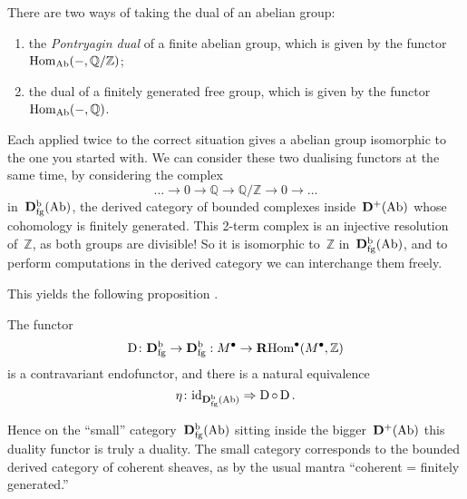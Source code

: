 \documentclass[10pt,a4paper]{article}
\begin{document}
There are two ways of taking the dual of an abelian group:
\begin{enumerate}
  \item the \emph{Pontryagin dual} of a finite abelian group, which is given by the functor~$\operatorname{Hom}_{\mathrm{Ab}}(-,\mathbb{Q}/\mathbb{Z})$;
  \item the dual of a finitely generated free group, which is given by the functor~$\operatorname{Hom}_{\mathrm{Ab}}(-,\mathbb{Q})$.
\end{enumerate}
Each applied twice to the correct situation gives a abelian group isomorphic to the one you started with. We can consider these two dualising functors at the same time, by considering the complex
\begin{equation}
  \dotso\to0\to\mathbb{Q}\to\mathbb{Q}/\mathbb{Z}\to0\to\dotso
\end{equation}
in~$\mathbf{D}_{\mathrm{fg}}^{\mathrm{b}}(\mathrm{Ab})$, the derived category of bounded complexes inside~$\mathbf{D}^+(\mathrm{Ab})$ whose cohomology is finitely generated. This 2-term complex is an injective resolution of~$\mathbb{Z}$, as both groups are divisible! So it is isomorphic to~$\mathbb{Z}$ in~$\mathbf{D}_{\mathrm{fg}}^{\mathrm{b}}(\mathrm{Ab})$, and to perform computations in the derived category we can interchange them freely.

This yields the following proposition \cite[proposition:V.1-1]{hartshorne-residues-and-duality}.
\begin{proposition}
  \label{proposition:duality-abelian-groups}
  The functor
  \begin{equation}
    \operatorname{D}\colon\mathbf{D}_{\mathrm{fg}}^{\mathrm{b}}\to\mathbf{D}_{\mathrm{fg}}^{\mathrm{b}}:M^\bullet\to\operatorname{\mathbf{R}Hom}^\bullet(M^\bullet,\mathbb{Z})
  \end{equation}
  is a contravariant endofunctor, and there is a natural equivalence
  \begin{equation}
    \eta\colon\mathrm{id}_{\mathbf{D}_{\mathrm{fg}}^{\mathrm{b}}(\mathrm{Ab})}\Rightarrow\operatorname{D}\circ\operatorname{D}.
  \end{equation}
\end{proposition}
Hence on the ``small'' category~$\mathbf{D}_{\mathrm{fg}}^{\mathrm{b}}(\mathrm{Ab})$ sitting inside the bigger~$\mathbf{D}^+(\mathrm{Ab})$ this duality functor is truly a duality. The small category corresponds to the bounded derived category of coherent sheaves, as by the usual mantra ``coherent = finitely generated.''
\end{document}

